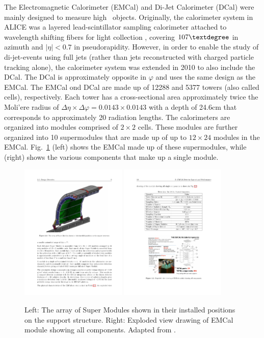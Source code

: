 The Electromagnetic Calorimeter (EMCal) and Di-Jet Calorimeter (DCal) were mainly designed to measure high \pt~objects. Originally, the calorimeter system in ALICE was a layered lead-scintillator sampling calorimeter attached to wavelength shifting fibers for light collection \cite{Blau2020}, covering $107\textdegree$ in azimuth and  $|\eta| < 0.7$ in pseudorapidity. However, in order to enable the study of di-jet-events using full jets (rather than jets reconstructed with charged particle tracking alone), the calorimeter system was extended in 2010 to also include the DCal. The DCal is approximately opposite in $\varphi$ and uses the same design as the EMCal. The EMCal ond DCal are made up of 12288 and 5377 towers (also called cells), respectively. Each tower has a cross-sectional area approximately twice the Moli'ere radius of $\Delta\eta\times\Delta\varphi = 0.0143\times0.0143$ with a depth of 24.6cm that corresponds to approximately 20 radiation lengths. The calorimeters are organized into modules comprised of $2\times2$ cells. These modules are further organized into 10 supermodules that are made up of up to $12\times24$ modules in the EMCal. Fig.~\ref{fig:emcal} (left) shows the EMCal made up of these supermodules, while (right) shows the various components that make up a single module.

\begin{figure}[htpb]
  \centering
  \includegraphics[width=0.45\textwidth]{Experimental_Aparatus/emcal.pdf}
  \includegraphics[width=0.45\textwidth]{Experimental_Aparatus/module.pdf}
  \caption{Left: The array of Super Modules shown in their installed positions on the support structure. Right: Exploded view drawing of EMCal module showing all components. Adapted from \cite{Bellwied2010}.}
  \label{fig:emcal}
\end{figure}


